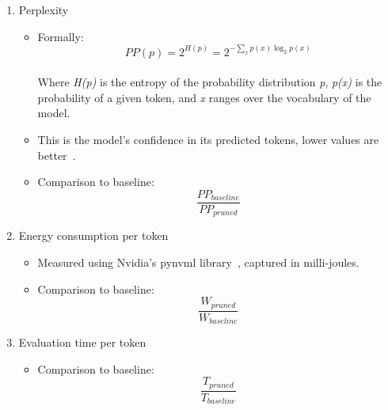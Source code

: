\documentclass[conference]{IEEEtran}
\begin{document}
    \begin{enumerate}
        \item Perplexity
        \begin{itemize}
            \item Formally:
            \\
            \begin{equation}
                PP(p) = 2^{H(p)} = 2^{-\sum_x p(x) \log_2 p(x)}
                \label{eq:perplexity}
            \end{equation}
            \\
            Where \textit{H(p)} is the entropy of the probability distribution \textit{p}, \textit{p(x)} is the probability of a given token, and \textit{x} ranges over the vocabulary of the model.
            \item This is the model's confidence in its predicted tokens, lower values are better~\cite{jelinek1977perplexity}.
            \item Comparison to baseline:
            \\
            \begin{equation}
                \frac{PP_{baseline}}{PP_{pruned}}
                \label{eq:perplexity_comparison}
            \end{equation}
        \end{itemize}
        \item Energy consumption per token
        \begin{itemize}
            \item Measured using Nvidia's pynvml library~\cite{nvidia_ml_py}, captured in milli-joules.
            \item Comparison to baseline:
            \\
            \begin{equation}
                \frac{W_{pruned}}{W_{baseline}}
                \label{eq:energy_comparison}
            \end{equation}
        \end{itemize}
        \item Evaluation time per token
        \begin{itemize}
            \item Comparison to baseline:
            \\
            \begin{equation}
                \frac{T_{pruned}}{T_{baseline}}
                \label{eq:evaluation_time_comparison}
            \end{equation}

\end{itemize}
\end{enumerate}
\end{document}
